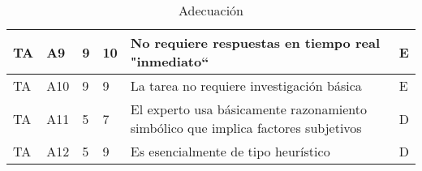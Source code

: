 \documentclass[a4paper,12pt]{article}
\begin{document}
\begin{table}[h]
\begin{tabular}{|l|l|l|l|p{4cm}|l|}
		TA                    & A9                        & 9                & 10                & No requiere respuestas en tiempo real "inmediato“                                                                                   & E                \\ \hline
		TA                    & A10                       & 9                & 9                 & La tarea no requiere investigación básica                                                                                           & E                \\ \hline
		TA                    & A11                       & 5                & 7                 & El experto usa básicamente razonamiento simbólico que implica factores subjetivos                                                   & D                \\ \hline
		TA                    & A12                       & 5                & 9                 & Es esencialmente de tipo heurístico                                                                                                 & D                \\ \hline
	\end{tabular}
	\caption{Adecuación}
	\label{tab:adecuacion}
\end{table}
\end{document}
